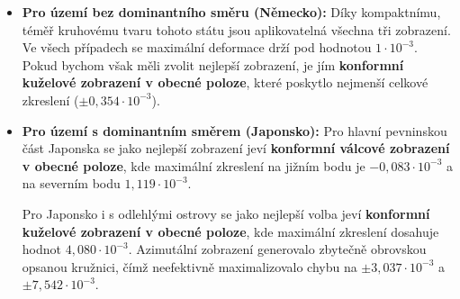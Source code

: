 \begin{itemize}
    \item \textbf{Pro území bez dominantního směru (Německo):} 
    Díky kompaktnímu, téměř kruhovému tvaru tohoto státu jsou aplikovatelná všechna tři zobrazení. Ve všech případech se maximální deformace drží pod  hodnotou $1 \cdot 10^{-3}$. Pokud bychom však měli zvolit nejlepší zobrazení, je jím \textbf{konformní kuželové zobrazení v obecné poloze}, které poskytlo nejmenší celkové zkreslení ($\pm 0,354 \cdot 10^{-3}$).
    
    \item \textbf{Pro území s dominantním směrem (Japonsko):} 
    Pro hlavní pevninskou část Japonska se jako nejlepší zobrazení jeví \textbf{konformní válcové zobrazení v obecné poloze}, kde maximální zkreslení na jižním bodu je $-0,083 \cdot 10^{-3}$ a na severním bodu $1,119 \cdot 10^{-3}$.
    
    Pro Japonsko i s odlehlými ostrovy se jako nejlepší volba jeví \textbf{konformní kuželové zobrazení v obecné poloze}, kde maximální zkreslení dosahuje hodnot $4,080 \cdot 10^{-3}$.
  	Azimutální zobrazení generovalo zbytečně obrovskou opsanou kružnici, čímž neefektivně maximalizovalo chybu na $\pm 3,037 \cdot 10^{-3}$ a $\pm 7,542 \cdot 10^{-3}$.
\end{itemize}
